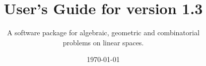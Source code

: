 \documentclass[12pt]{article}
\title{User's Guide for \FourTiTwo{} version 1.3}
\author{A software package for algebraic, 
geometric and combinatorial\\ problems on linear spaces.}
\date{\today}
\theoremstyle{definition}
\newcommand{\FourTiTwo}{{\tt 4ti2}}
\begin{document}
\maketitle

\newpage

\tableofcontents

\newpage


\begin{comment}

\section{Introduction}


\FourTiTwo{} is a software package that is specifically tailored for
certain computational problems on linear spaces and integer lattices. This includes for example the computation of generating sets for lattice ideals, the computation of extreme rays or Hilbert bases of cones, or the computation of Graver bases of a lattice. These sets appear in many different branches of
mathematics such as integer programming, combinatorics, or statistics.

To list the main functionality available in version 1.3 of
\FourTiTwo{} is the following:

\begin{tabular}{|l|l|}
\hline
command & Computes what?\\
\hline
groebner & Gr\"obner basis of lattice ideal\\
markov  & generating set of lattice ideal\\
graver  & Graver basis of a lattice\\
hilbert & $\leq$-minimal nonnegative elements in a lattice\\
solve   & explicit representation of set of real and integer solutions 
	  to system\\ 
	& of equations and inequalitites\\
\hline
\end{tabular}

The explicit invocation of each command is given below.

\end{comment}
\end{document}
